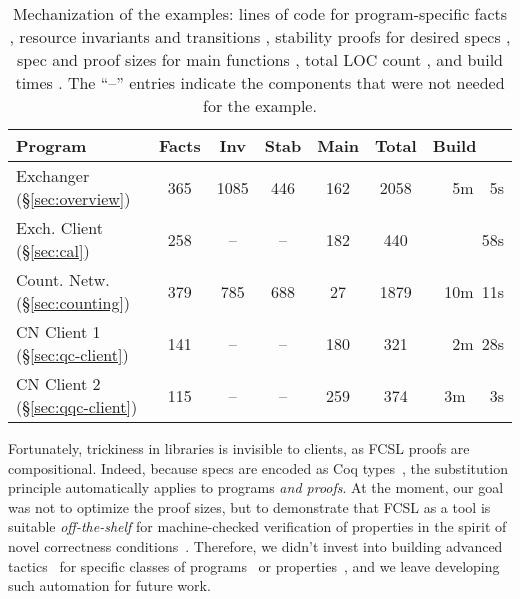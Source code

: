 
{
\setlength{\belowcaptionskip}{-1pt} 
\begin{table}
{%
\sffamily\small %
\centering
\begin{tabular}{|@{\ }l@{\ }||@{\ }c@{\ }|@{\ }c@{\ }|@{\ }c@{\ }|@{\ }c@{\ }|@{\ }c@{\ }||@{\ }r@{\ }|}
  \hline
  \textbf{Program} &  
  {Facts} & {Inv} &
  {Stab} & {Main} & \textbf{Total}
  & \textbf{Build~~~}    
  \\ \hline \hline 
  Exchanger \hfill (\S \ref{sec:overview}) & 365 & 1085 & 446 & 162 & 2058 & 5m~~5s
  \\
  Exch. Client \hfill (\S \ref{sec:cal}) & 258 & -- &--& 182 & 440 & 58s
  \\
  Count. Netw. \hfill (\S \ref{sec:counting}) & 379 & 785 & 688 & 27 & 1879 & 10m~11s
  \\
  CN Client 1 \hfill (\S \ref{sec:qc-client}) & 141 &--&--& 180  & 321 & 2m~28s
  \\
  CN Client 2 \hfill (\S \ref{sec:qqc-client})& 115 &--&--& 259 & 374 & 3m~~~3s 
  \\[2pt] \hline
\end{tabular}
}
\caption{
  Mechanization of the examples: lines of code for program-specific facts ,
  resource invariants and transitions , 
  stability proofs for desired specs , spec and proof sizes for main
  functions , total LOC count , and build
  times . The ``--'' entries indicate the
  components that were not needed for the example.
} 
\label{tab:locs}
\vspace{-15pt}
\end{table}}

Fortunately, trickiness in libraries is invisible to clients, as FCSL
proofs are compositional. Indeed, because specs are encoded as Coq
types~\cite{Sergey-al:PLDI15}, the substitution principle
automatically applies to programs \emph{and proofs}.
%
%
At the moment, our goal was not to optimize the proof sizes, but to
demonstrate that FCSL as a tool is suitable \emph{off-the-shelf} for
machine-checked verification of properties in the spirit of novel
correctness
conditions~\cite{Hemed-al:DISC15,Aspnes-al:JACM94,Jagadeesan-Riely:ICALP14}.
Therefore, we didn't invest into building advanced
tactics~\cite{Chlipala:PLDI11,McCreight:TPHOL09} for specific classes
of programs~\cite{Zee-al:PLDI08} or
properties~\cite{Dragoi-al:CAV13,Vafeiadis:CAV10,Bouajjani-al:POPL15,Burckhardt-al:PLDI10},
and we leave developing such automation for future work.

